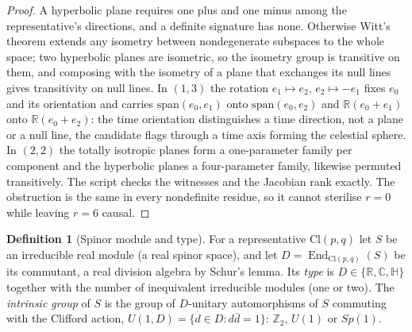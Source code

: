 \documentclass[11pt]{article}
\theoremstyle{definition}
\newtheorem{definition}[theorem]{Definition}
\newcommand{\Cl}{\mathrm{Cl}}
\newcommand{\R}{\mathbb{R}}
\newcommand{\C}{\mathbb{C}}
\newcommand{\End}{\operatorname{End}}
\begin{document}
\begin{proof}
A hyperbolic plane requires one plus and one minus among the representative's directions, and a definite signature has none. Otherwise Witt's theorem extends any isometry between nondegenerate subspaces to the whole space; two hyperbolic planes are isometric, so the isometry group is transitive on them, and composing with the isometry of a plane that exchanges its null lines gives transitivity on null lines. In $(1,3)$ the rotation $e_{1} \mapsto e_{2}$, $e_{2} \mapsto -e_{1}$ fixes $e_{0}$ and its orientation and carries $\mathrm{span}(e_{0}, e_{1})$ onto $\mathrm{span}(e_{0}, e_{2})$ and $\R(e_{0} + e_{1})$ onto $\R(e_{0} + e_{2})$: the time orientation distinguishes a time direction, not a plane or a null line, the candidate flags through a time axis forming the celestial sphere. In $(2,2)$ the totally isotropic planes form a one-parameter family per component and the hyperbolic planes a four-parameter family, likewise permuted transitively. The script checks the witnesses and the Jacobian rank exactly. The obstruction is the same in every nondefinite residue, so it cannot sterilise $r = 0$ while leaving $r = 6$ causal.
\end{proof}

\begin{definition}[Spinor module and type]\label{def:type}
For a representative $\Cl(p,q)$ let $S$ be an irreducible real module (a real spinor space), and let $D = \End_{\Cl(p,q)}(S)$ be its commutant, a real division algebra by Schur's lemma. Its \emph{type} is $D \in \{\R, \C, \mathbb{H}\}$ together with the number of inequivalent irreducible modules (one or two). The \emph{intrinsic group} of $S$ is the group of $D$-unitary automorphisms of $S$ commuting with the Clifford action, $U(1, D) = \{d \in D : d\bar{d} = 1\}$: $\mathbb{Z}_{2}$, $U(1)$ or $Sp(1)$.
\end{definition}
\end{document}
